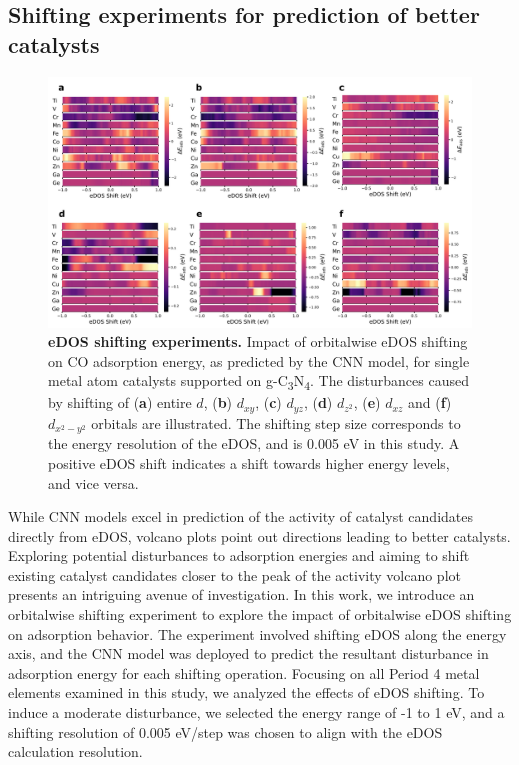 
\subsection{Shifting experiments for prediction of better catalysts}

\begin{figure}[htbp]
    \centering
    \includegraphics[width=\textwidth]{main_fig5_shifting.png}
    \caption{\textbf{eDOS shifting experiments.}
    Impact of orbitalwise eDOS shifting on CO adsorption energy, as predicted by the CNN model,
    for single metal atom catalysts supported on g-C\textsubscript{3}N\textsubscript{4}.
    The disturbances caused by shifting of (\textbf{a}) entire $d$, (\textbf{b}) $d_{xy}$,
    (\textbf{c}) $d_{yz}$, (\textbf{d}) $d_{z^2}$, (\textbf{e}) $d_{xz}$ and
    (\textbf{f}) $d_{x^2-y^2}$ orbitals are illustrated.
    The shifting step size corresponds to the energy resolution of the eDOS,
    and is 0.005 eV in this study.
    A positive eDOS shift indicates a shift towards higher energy levels, and vice versa.}
    \label{main_fig5:shifting}
\end{figure}

While CNN models excel in prediction of the activity of catalyst candidates directly from eDOS,
volcano plots point out directions leading to better catalysts.
Exploring potential disturbances to adsorption energies and aiming to shift existing catalyst
candidates closer to the peak of the activity volcano plot presents an intriguing avenue of investigation.
In this work, we introduce an orbitalwise shifting experiment to explore
the impact of orbitalwise eDOS shifting on adsorption behavior.
The experiment involved shifting eDOS along the energy axis,
and the CNN model was deployed to predict the resultant disturbance in adsorption energy for each shifting operation.
Focusing on all Period 4 metal elements examined in this study, we analyzed the effects of eDOS shifting.
To induce a moderate disturbance, we selected the energy range of -1 to 1 eV,
and a shifting resolution of 0.005 eV/step was chosen to align with the eDOS calculation resolution.

